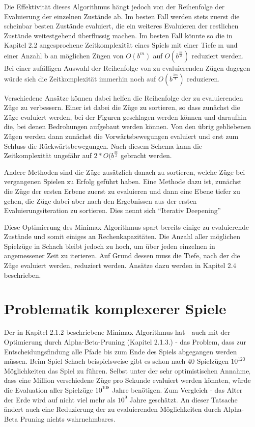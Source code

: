 Die Effektivität dieses Algorithmus hängt jedoch von der Reihenfolge der Evaluierung der einzelnen Zustände ab. Im besten Fall werden stets zuerst die scheinbar besten Zustände evaluiert, die ein weiteres Evaluieren der restlichen Zustände weitestgehend überflussig machen. Im besten Fall könnte so die in Kapitel 2.2 angesprochene Zeitkomplexität eines Spiels mit einer Tiefe m und einer Anzahl b an möglichen Zügen von $O(b^m)$ auf $O(b^\frac{m}{2})$ reduziert werden. Bei einer zufälligen Auswahl der Reihenfolge von zu evaluierenden Zügen dagegen würde sich die Zeitkomplexität immerhin noch auf $O(b^\frac{3m}{4})$ reduzieren.

Verschiedene Ansätze können dabei helfen die Reihenfolge der zu evaluierenden Züge zu verbessern. Einer ist dabei die Züge zu sortieren, so dass zunächst die Züge evaluiert werden, bei der Figuren geschlagen werden können und daraufhin die, bei denen Bedrohungen aufgebaut werden können. Von den übrig gebliebenen Zügen werden dann zunächst die Vorwärtsbewegungen evaluiert und erst zum Schluss die Rückwärtsbewegungen. Nach diesem Schema kann die Zeitkomplexität ungefähr auf $2*O(b^\frac{m}{2}$ gebracht werden.

Andere Methoden sind die Züge zusätzlich danach zu sortieren, welche Züge bei vergangenen Spielen zu Erfolg geführt haben. Eine Methode dazu ist, zunächst die Züge der ersten Erbene zuerst zu evaluieren und dann eine Ebene tiefer zu gehen, die Züge dabei aber nach den Ergebnissen aus der ersten Evaluierungsiteration zu sortieren. Dies nennt sich ``Iterativ Deepening''

Diese Optimierung des Minimax Algorithmus spart bereits einige zu evaluierende Zustände und somit einiges an Rechenkapazitäten. Die Anzahl aller möglichen Spielzüge in Schach bleibt jedoch zu hoch, um über jeden einzelnen in angemessener Zeit zu iterieren. Auf Grund dessen muss die Tiefe, nach der die Züge evaluiert werden, reduziert werden. Ansätze dazu werden in Kapitel 2.4 beschrieben.

\section{Problematik komplexerer Spiele}

Der in Kapitel 2.1.2 beschriebene Minimax-Algorithmus hat - auch mit der Optimierung durch Alpha-Beta-Pruning (Kapitel 2.1.3.) - das Problem, dass zur Entscheidungsfindung alle Pfade bis zum Ende des Spiels abgegangen werden müssen. Beim Spiel Schach beispielsweise gibt es schon nach 40 Spielzügen $10^120$ Möglichkeiten das Spiel zu führen. Selbst unter der sehr optimistischen Annahme, dass eine Million verschiedene Züge pro Sekunde evaluiert werden könnten, würde die Evaluation aller Spielzüge $10^108$ Jahre benötigen. Zum Vergleich - das Alter der Erde wird auf nicht viel mehr als $10^9$ Jahre geschätzt. An dieser Tatsache ändert auch eine Reduzierung der zu evaluierenden Möglichkeiten durch Alpha-Beta Pruning nichts wahrnehmbares.


